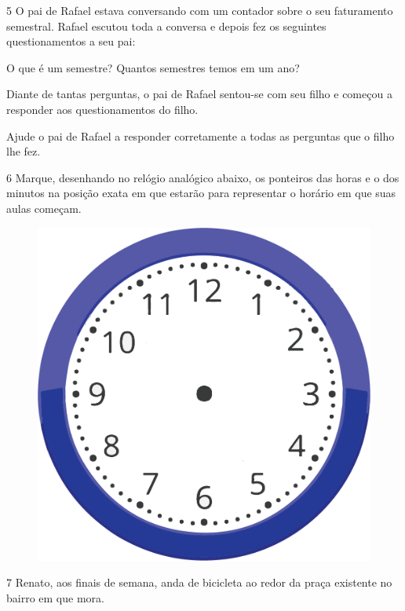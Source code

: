 \num{5} O pai de Rafael estava conversando com um contador sobre o seu
faturamento semestral. Rafael escutou toda a conversa e depois fez os
seguintes questionamentos a seu pai:

O que é um semestre? 
Quantos semestres temos em um ano?

Diante de tantas perguntas, o pai de Rafael sentou-se com seu filho e
começou a responder aos questionamentos do filho.

Ajude o pai de Rafael a responder corretamente a todas as perguntas que o filho lhe fez.


\pagebreak
\num{6} Marque, desenhando no relógio analógico abaixo, os ponteiros das horas e o dos
minutos na posição exata em que estarão para representar o horário em que
suas aulas começam.

\begin{figure}[htpb!]
\includegraphics[width=\textwidth]{./media/image54b.png}
\end{figure}


\pagebreak
\num{7} Renato, aos finais de semana, anda de bicicleta ao redor da praça existente no bairro em que mora.

